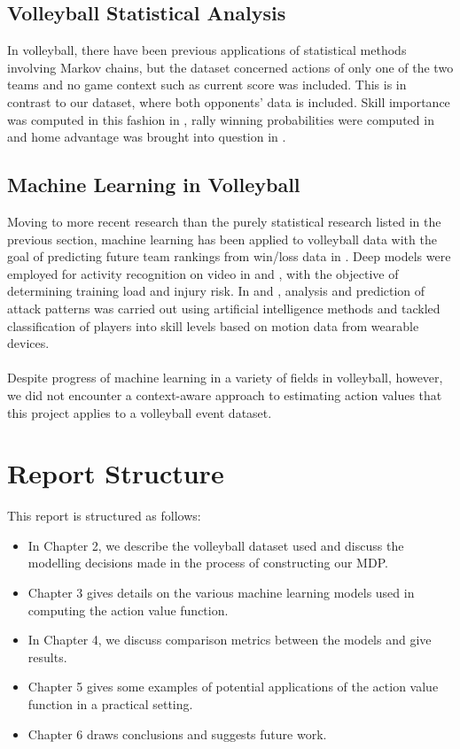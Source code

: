 \documentclass{sfuthesis}
\begin{document}
	\subsection{Volleyball Statistical Analysis}
	In volleyball, there have been previous applications of statistical methods involving Markov chains, but the dataset concerned actions of only one of the two teams and no game context such as current score was included. This is in contrast to our dataset, where both opponents' data is included. Skill importance was computed in this fashion in \cite{miskin2010skill}, rally winning probabilities were computed in \cite{florence2008skill} and home advantage was brought into question in \cite{alexandros2012existence}.
	\subsection{Machine Learning in Volleyball}
	Moving to more recent research than the purely statistical research listed in the previous section, machine learning has been applied to volleyball data with the goal of predicting future team rankings from win/loss data in \cite{tumer2017prediction}.  Deep models were employed for activity recognition on video in \cite{ibrahim2018deep} and \cite{kautz2017activity}, with the objective of determining training load and injury risk. In \cite{wenninger2020performance} and \cite{van2016analyzing}, analysis and prediction of attack patterns was carried out using artificial intelligence methods and \cite{wang2018volleyball} tackled classification of players into skill levels based on motion data from wearable devices.\\\\
	Despite progress of machine learning in a variety of fields in volleyball, however, we did not encounter a context-aware approach to estimating action values  that this project applies to a volleyball event dataset.
	
	\section{Report Structure}
	This report is structured as follows:
	\begin{itemize}
		\item In Chapter 2, we describe the volleyball dataset used and discuss the modelling decisions made in the process of constructing our MDP.
		\item Chapter 3 gives details on the various machine learning models used in computing the action value function.
		\item In Chapter 4, we discuss comparison metrics between the models and give results.
		\item Chapter 5 gives some examples of potential applications of the action value function in a practical setting.
		\item Chapter 6 draws conclusions and suggests future work.
	\end{itemize}
	
\end{document}
